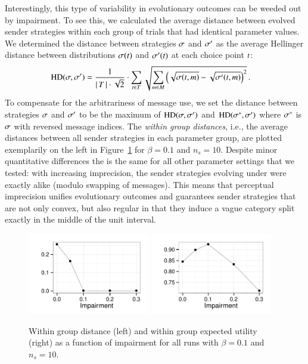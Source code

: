 \documentclass[fleqn,reqno,10pt]{article}
\newcommand{\rdd}{\acro{rdd}} %
\newcommand{\toler}{\ensuremath{\beta}} %
\begin{document}
Interestingly, this type of variability in evolutionary outcomes can
be weeded out by impairment. To see this, we calculated the average
distance between evolved sender strategies within each group of trials
that had identical parameter values. We determined the distance
between strategies $\sigma$ and $\sigma'$ as the average Hellinger
distance between distributions $\sigma(t)$ and
$\sigma'(t)$ at each choice point $t$:
\begin{align*}
  \text{HD}(\sigma,\sigma') & = \frac{1}{{\left \lvert \, T \, \right\rvert \cdot
     \sqrt{2}}} \cdot  \sum_{t \in T} 
 \sqrt{\sum_{m \in  M}
         \left ( \sqrt{\sigma(t,m)} -
         \sqrt{\sigma'(t,m)} \right )^2 }\,.
\end{align*}
To compensate for the arbitrariness of message use, we set the
distance between strategies $\sigma$ and $\sigma'$ to be the maximum
of $\text{HD}(\sigma,\sigma')$ and $\text{HD}(\sigma^*,\sigma')$
where $\sigma^*$ is $\sigma$ with reversed message indices. The
\emph{within group distances}, i.e., the average distances between all
sender strategies in each parameter group, are plotted exemplarily on
the left in Figure~\ref{fig:GroupMeasures} for $\beta = 0.1$ and $n_s
= 10$. Despite minor quantitative differences the is the same for all
other parameter settings that we tested: with increasing imprecision,
the sender strategies evolving under \rdd were exactly alike (modulo
swapping of messages). This means that perceptual imprecision unifies
evolutionary outcomes and guarantees sender strategies that are not
only convex, but also regular in that they induce a vague category
split exactly in the middle of the unit interval.

\begin{figure}
  \centering

    \includegraphics[width=0.475\textwidth]{plots/WithinGroupDistanceConcise.pdf}
    \hfill
    \includegraphics[width=0.475\textwidth]{plots/WithinGroupEUConcise.pdf}

    \caption{Within group distance (left) and within group expected
      utility (right) as a function of impairment for all runs with
      $\toler = 0.1$ and $n_s = 10$.}
  \label{fig:GroupMeasures}
\end{figure}
\end{document}
